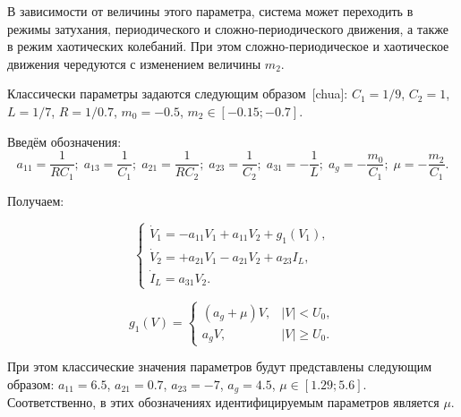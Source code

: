 \documentclass[a4paper,12pt]{article}
\begin{document}
В зависимости от величины этого параметра,
система может переходить в режимы затухания,
периодического и сложно-периодического движения, а также в режим
хаотических колебаний. При этом сложно-периодическое и хаотическое
движения чередуются с изменением величины \(m_2\).


Классически параметры задаются следующим образом~[chua]:
$C_1 = 1/9$, $C_2 = 1$, $L= 1/7$, $R = 1/0.7$, $m_0=-0.5$, $ m_2 \in [ -0.15; -0.7 ] $.

Введём обозначения:
\[
  a_{11} = \frac{1}{R C_1}; \;
  a_{13} = \frac{1}{C_1}; \;
  a_{21} = \frac{1}{R C_2}; \;
  a_{23} = \frac{1}{C_2}; \;
  a_{31} = -\frac{1}{L}; \;
  a_g = - \frac{m_0}{C_1}; \;
  \mu = - \frac{m_2}{C_1}.
\]

\noindent
Получаем:

\begin{equation}
\begin{cases}
  \dot{V}_1  = -a_{11} V_1 + a_{11}  V_2  + g_1(V_1) , \\
  \dot{V}_2  = +a_{21} V_1 - a_{21}  V_2  + a_{23} I_L    , \\
  \dot{I}_L  =  a_{31} V_2.
\end{cases}
\label{atu:eq:chua2}
\end{equation}


\begin{equation}
g_1(V) =
\begin{cases}
  ( a_g + \mu ) V , & |V| <   U_0, \\
  a_g V           , & |V| \ge U_0.
\end{cases}
\label{atu:eq:diodchua2}
\end{equation}

При этом классические значения параметров будут представлены следующим образом:
$ a_{11} = 6.5 $, $a_{21} = 0.7$, $ a_{23} = -7 $, $ a_g = 4.5 $,
$ \mu \in [ 1.29 ; 5.6 ] $.
Соответственно, в этих обозначениях
идентифицируемым параметров является $\mu$.
\end{document}
